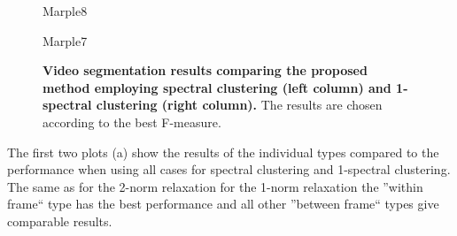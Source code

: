 \begin{figure}[htbp]
\begin{minipage}[t]{1\textwidth}
\end{minipage}
\begin{minipage}[t]{1\textwidth}
\centering
\footnotesize Marple8%

\end{minipage}
\begin{minipage}[t]{1\textwidth}
\centering
\footnotesize Marple7%

\end{minipage}
 \caption[Video segmentation results comparing the proposed method employing spectral clustering and 1-spectral clustering]{
  {\bf Video segmentation results comparing the proposed method employing spectral clustering (left column) and 1-spectral clustering (right column).} The results are chosen according to the best F-measure.}
\label{fig:seg_res_1sc_sc}
\end{figure}

The first two plots (a) show the results of the individual types compared to the performance when using all cases for spectral clustering and 1-spectral clustering. 
The same as for the 2-norm relaxation for the 1-norm relaxation the ''within frame`` type has the best performance and all other ''between frame`` types give comparable results.

